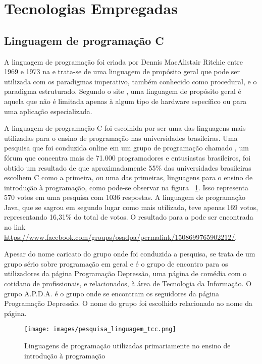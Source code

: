 \documentclass[12pt, %
openright,
oneside, %
a4paper,    %
brazil]{facom-ufu-abntex2}
\begin{document}
\section{Tecnologias Empregadas}

\subsection{Linguagem de programação C}
A linguagem de programação  foi criada por Dennis MacAlistair Ritchie entre 1969 e 1973 na  e trata-se de uma linguagem de propósito geral que pode ser utilizada com os paradigmas imperativo, também conhecido como procedural, e o paradigma estruturado. Segundo o site , uma linguagem de propósito geral é aquela que não é limitada apenas à algum tipo de hardware específico ou para uma aplicação especializada.

A linguagem de programação C foi escolhida por ser uma das linguagens mais utilizadas para o ensino de programação nas universidades brasileiras. Uma pesquisa que foi conduzida online em um grupo de programação chamado , um fórum que concentra mais de 71.000 programadores e entusiastas brasileiros, foi obtido um resultado de que aproximadamente 55\% das universidades brasileiras escolhem C como a primeira, ou uma das primeiras, linguagens para o ensino de introdução à programação, como pode-se observar na figura ~\ref{fig:pesquisa_linguagem_tcc}. Isso representa 570 votos em uma pesquisa com 1036 respostas. A linguagem de programação Java, que se sagrou em segundo lugar como mais utilizada, teve apenas 169 votos, representando 16,31\% do total de votos. O resultado para a  pode ser encontrada no link \hyperref[https://www.facebook.com/groups/osadpa/permalink/1508699765902212/]{https://www.facebook.com/groups/osadpa/permalink/1508699765902212/}.

Apesar do nome caricato do grupo onde foi conduzida a pesquisa, se trata de um grupo sério sobre programação em geral e é o grupo de encontro para os utilizadores da página Programação Depressão, uma página de comédia com o cotidano de profissionais, e relacionados, à área de Tecnologia da Informação. O grupo A.P.D.A. é o grupo onde se encontram os seguidores da página Programação Depressão. O nome do grupo foi escolhido relacionado ao nome da página.

\pagebreak
\begin{figure}[htbp]
  \centering
  \texttt{[image: images/pesquisa\_linguagem\_tcc.png]}
  \caption{Linguagens de programação utilizadas primariamente no ensino de introdução à programação}
  \label{fig:pesquisa_linguagem_tcc}
\end{figure}
\end{document}
